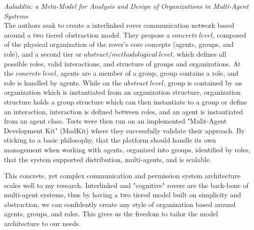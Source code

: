 \textit{Aaladdin: a Meta-Model for Analysis and Design of Organizations in Multi-Agent Systems}~\cite{ferber1998meta} \\

The authors seak to create a interlinked rover communication network based around a two tiered obstraction model. They propose a $concrete~level$, composed of the physical organization of the rover's core concepts (agents, groups, and role), and a second tier or $abstract/methodological~level$, which defines all possible roles, valid interactions, and structure of groups and organizations. At the $concrete~level$, agents are a member of a group, group contains a role, and role is handled by agents. While on the $abstract~level$, group is contained by an organization which is instantiated from an organization structure, organization structure holds a group structure which can then instantiate to a group or define an interaction, interaction is defined between roles, and an agent is instantiated from an agent class. Tests were then run on an implemented "Mulit-Agent Development Kit" (MadKit) where they successfully validate their approach. By sticking to a basic philosophy, that the platform should handle its own management when working with agents, organized into groups, identified by roles, that the system supported distribution, multi-agents, and is scalable.

This concrete, yet complex communication and permission system architecture scales well to my research. Interlinked and "cognitive" rovers are the back-bone of multi-agent systems, thus by having a two tiered model built on simplicity and abstraction, we can confidently create any style of organization based around agents, groups, and roles. This gives us the freedom to tailor the model architecture to our needs.